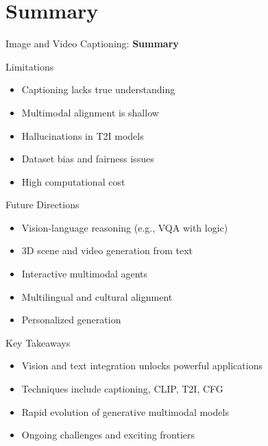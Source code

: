 \section{Summary}
\begin{frame}{}
    \LARGE Image and Video Captioning: \textbf{Summary}
\end{frame}

\begin{frame}{Limitations}
    \begin{itemize}
        \item Captioning lacks true understanding
        \item Multimodal alignment is shallow
        \item Hallucinations in T2I models
        \item Dataset bias and fairness issues
        \item High computational cost
    \end{itemize}
\end{frame}

\begin{frame}{Future Directions}
    \begin{itemize}
        \item Vision-language reasoning (e.g., VQA with logic)
        \item 3D scene and video generation from text
        \item Interactive multimodal agents
        \item Multilingual and cultural alignment
        \item Personalized generation
    \end{itemize}
\end{frame}

\begin{frame}{Key Takeaways}
    \begin{itemize}
        \item Vision and text integration unlocks powerful applications
        \item Techniques include captioning, CLIP, T2I, CFG
        \item Rapid evolution of generative multimodal models
        \item Ongoing challenges and exciting frontiers
    \end{itemize}
\end{frame}